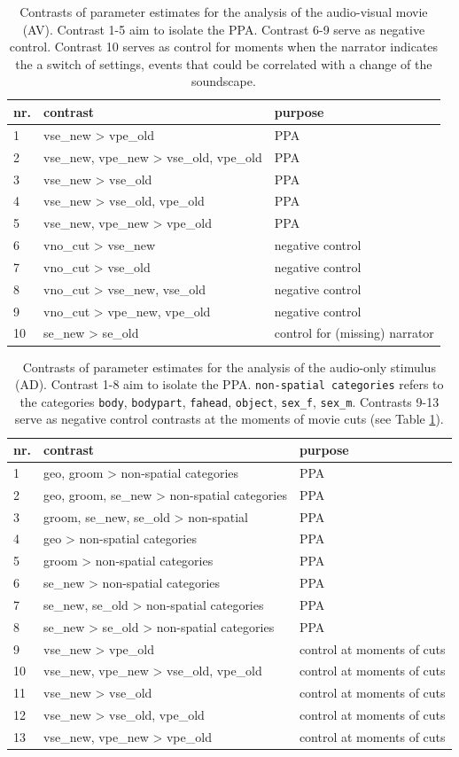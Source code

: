 \documentclass[english]{article}
\begin{document}
\begin{table}[h!]
\caption{Contrasts of parameter estimates for the analysis of the
    audio-visual movie (AV).
    Contrast 1-5 aim to isolate the PPA.
    Contrast 6-9 serve as negative control.
    Contrast 10 serves as control for moments when the narrator indicates the
    a switch of settings, events that could be correlated with a
    change of the soundscape.}
\label{tab:av-contrasts}
\footnotesize
\begin{tabular}{lll}
\toprule
\textbf{nr.} &  \textbf{contrast} & \textbf{purpose} \\
\midrule
1 & vse\_new > vpe\_old & PPA \tabularnewline
2 & vse\_new, vpe\_new > vse\_old, vpe\_old & PPA \tabularnewline
3 & vse\_new > vse\_old & PPA \tabularnewline
4 & vse\_new > vse\_old, vpe\_old & PPA \tabularnewline
5 & vse\_new, vpe\_new > vpe\_old & PPA \tabularnewline
6 & vno\_cut > vse\_new & negative control \tabularnewline
7 & vno\_cut > vse\_old & negative control \tabularnewline
8 & vno\_cut > vse\_new, vse\_old & negative control \tabularnewline
9 & vno\_cut > vpe\_new, vpe\_old & negative control \tabularnewline
10 & se\_new > se\_old & control for (missing) narrator \tabularnewline
\end{tabular}
\end{table}


\begin{table}[h!]
\caption{Contrasts of parameter estimates for the analysis of the audio-only
    stimulus (AD).
    Contrast 1-8 aim to isolate the PPA.
    \texttt{non-spatial categories} refers to the categories
    \texttt{body}, \texttt{bodypart}, \texttt{fahead},
    \texttt{object}, \texttt{sex\_f}, \texttt{sex\_m}.
    Contrasts 9-13 serve as negative control contrasts at the moments of movie
    cuts (see Table \ref{tab:av-contrasts}).}
\label{tab:ao-contrasts}
\footnotesize
\begin{tabular}{lll}
\toprule
\textbf{nr.} &  \textbf{contrast} & \textbf{purpose} \\
\midrule
1 & geo, groom > non-spatial categories & PPA \tabularnewline
2 & geo, groom, se\_new > non-spatial categories & PPA \tabularnewline
3 & groom, se\_new, se\_old > non-spatial  & PPA \tabularnewline
4 & geo > non-spatial categories & PPA \tabularnewline
5 & groom > non-spatial categories & PPA \tabularnewline
6 & se\_new > non-spatial categories & PPA \tabularnewline
7 & se\_new, se\_old > non-spatial categories & PPA \tabularnewline
8 & se\_new > se\_old > non-spatial categories & PPA \tabularnewline
9 & vse\_new > vpe\_old & control at moments of cuts \tabularnewline
10 & vse\_new, vpe\_new > vse\_old, vpe\_old & control at moments of cuts \tabularnewline
11 & vse\_new > vse\_old & control at moments of cuts \tabularnewline
12 & vse\_new > vse\_old, vpe\_old & control at moments of cuts \tabularnewline
13 & vse\_new, vpe\_new > vpe\_old & control at moments of cuts \tabularnewline
\end{tabular}
\end{table}
\end{document}
